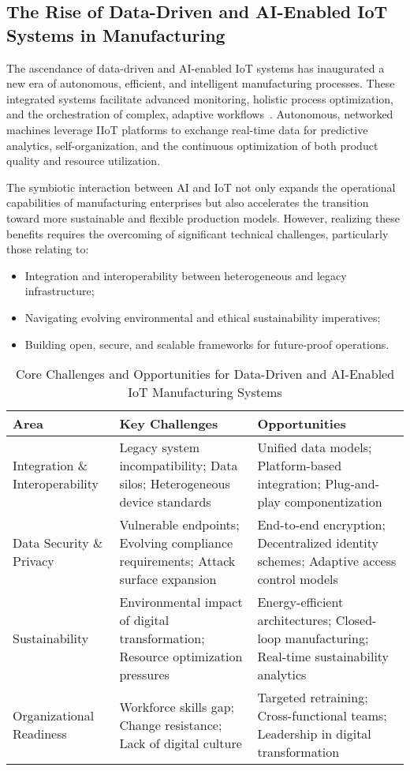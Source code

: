 \documentclass[sigconf]{acmart}
\begin{document}
\subsection{The Rise of Data-Driven and AI-Enabled IoT Systems in Manufacturing}

The ascendance of data-driven and AI-enabled IoT systems has inaugurated a new era of autonomous, efficient, and intelligent manufacturing processes. These integrated systems facilitate advanced monitoring, holistic process optimization, and the orchestration of complex, adaptive workflows~\cite{ref31}. Autonomous, networked machines leverage IIoT platforms to exchange real-time data for predictive analytics, self-organization, and the continuous optimization of both product quality and resource utilization.

The symbiotic interaction between AI and IoT not only expands the operational capabilities of manufacturing enterprises but also accelerates the transition toward more sustainable and flexible production models. However, realizing these benefits requires the overcoming of significant technical challenges, particularly those relating to:
\begin{itemize}
    \item Integration and interoperability between heterogeneous and legacy infrastructure;
    \item Navigating evolving environmental and ethical sustainability imperatives;
    \item Building open, secure, and scalable frameworks for future-proof operations.
\end{itemize}

\begin{table*}[htbp]
\centering
\caption{Core Challenges and Opportunities for Data-Driven and AI-Enabled IoT Manufacturing Systems}
\label{tab:ai_iot_challenges}
\begin{adjustbox}{max width=\textwidth}
\begin{tabular}{lll}
\toprule
\textbf{Area} & \textbf{Key Challenges} & \textbf{Opportunities} \\
\midrule
Integration \& Interoperability & Legacy system incompatibility; Data silos; Heterogeneous device standards & Unified data models; Platform-based integration; Plug-and-play componentization \\
Data Security \& Privacy & Vulnerable endpoints; Evolving compliance requirements; Attack surface expansion & End-to-end encryption; Decentralized identity schemes; Adaptive access control models \\
Sustainability & Environmental impact of digital transformation; Resource optimization pressures & Energy-efficient architectures; Closed-loop manufacturing; Real-time sustainability analytics \\
Organizational Readiness & Workforce skills gap; Change resistance; Lack of digital culture & Targeted retraining; Cross-functional teams; Leadership in digital transformation \\
\bottomrule
\end{tabular}
\end{adjustbox}
\end{table*}
\end{document}
